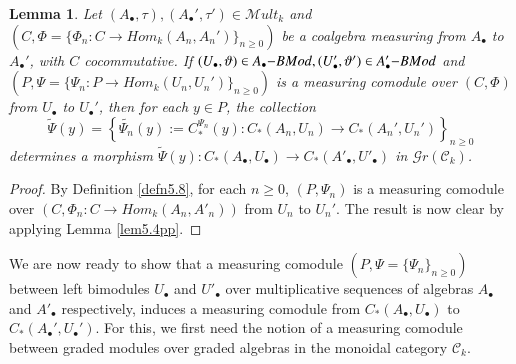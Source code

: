 \documentclass[10pt, colorlinks]{article}
\numberwithin{equation}{section} \DeclareMathSizes{2}{10}{12}{13}
\newtheorem{lem}[thm]{Lemma}
\begin{document}
 \begin{lem}
       Let $(A_\bullet,\tau),(A_\bullet',\tau')\in \mathscr Mult_k$ and $(C,\Phi=\{\Phi_n:C\longrightarrow Hom_k(A_n,A_n')\}_{n\geq 0})$ be a coalgebra measuring from $A_\bullet$ to $A_\bullet'$, with $C$ cocommutative.
    If $(U_\bullet,\vartheta)\in {A_\bullet\small{-}}BMod,(U'_\bullet,\vartheta')\in A'_\bullet\small{-}BMod$ and $(P,\Psi=\{\Psi_n:P\longrightarrow  {Hom}_k(U_n,U_n')\}_{n\geq 0})$ is a measuring comodule over $(C,\Phi)$ from $U_\bullet$ to $U_\bullet'$, then for each $y\in P$, the collection 
    \begin{equation}
     \widetilde{\Psi}(y)=\left\{\widetilde{\Psi_n}(y):=C_*^{\Psi_n}(y):C_*(A_n,U_n)\longrightarrow C_*(A_n',U_n')\right\}_{n\geq 0}
    \end{equation} determines a morphism $\widetilde{\Psi}(y): C_*(A_\bullet,U_\bullet)\longrightarrow  C_*(A'_\bullet,U'_\bullet)$ in $\mathscr Gr(\mathcal C_k)$.
 \end{lem}
 \begin{proof}
 By Definition \ref{defn5.8},  for each $n\geq 0$, $(P,\Psi_n)$ is a measuring comodule over $(C,\Phi_n:C\longrightarrow Hom_k(A_n,A'_n))$ from $U_n$ to $U_n'$. The result is now clear by applying Lemma \ref{lem5.4pp}. 
 \end{proof}
 

We are now ready to show that a measuring comodule $(P,\Psi=\{\Psi_n\}_{n\geq 0})$ between left bimodules $U_\bullet$ and $U'_\bullet$ over multiplicative sequences of algebras $A_\bullet$ and $A'_\bullet$ respectively, induces a measuring comodule from $C_*(A_\bullet,U_\bullet)$ to $C_*(A_\bullet',U_\bullet')$. For this, we first need the notion of a measuring comodule between graded modules over graded algebras in the monoidal category $\mathcal C_k$.
\end{document}
